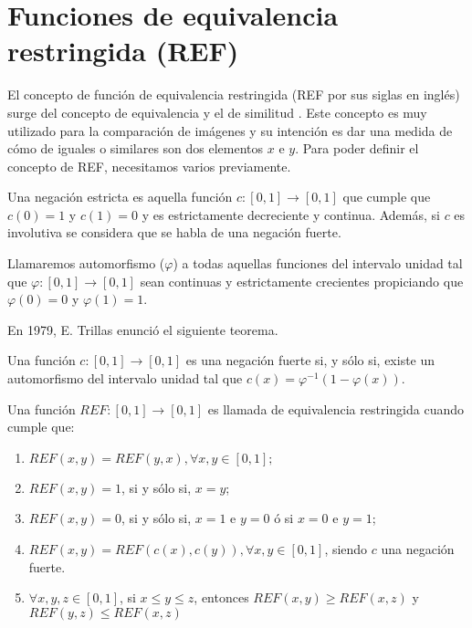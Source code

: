 \documentclass[main]{subfiles}
\begin{document}
\section{Funciones de equivalencia restringida (REF)}\label{sec:ref}
El concepto de función de equivalencia restringida (REF por sus siglas en inglés) surge del concepto de equivalencia y el de similitud \cite{art:refbarrenechea}. Este concepto es muy utilizado para la comparación de imágenes y su intención es dar una medida de cómo de iguales o similares son dos elementos $x$ e $y$. Para poder definir el concepto de REF, necesitamos varios previamente.

\begin{definition}\label{def:negacionestricta}
Una negación estricta es aquella función ${c : [0, 1] \rightarrow [0, 1]}$ que cumple que ${c(0)=1}$ y ${c(1)=0}$ y es estrictamente decreciente y continua. Además, si $c$ es involutiva se considera que se habla de una negación fuerte.
\end{definition}

\begin{definition}\label{def:automorfismo}
Llamaremos automorfismo ($\varphi$) a todas aquellas funciones del intervalo unidad tal que ${\varphi : [0, 1] \rightarrow [0, 1]}$ sean continuas y estrictamente crecientes propiciando que ${\varphi(0)=0}$ y ${\varphi(1)=1}$.
\end{definition}

En 1979, E. Trillas \cite{art:thtrillas} enunció el siguiente teorema.
\begin{theorem}\label{th:trillas}
Una función ${c : [0, 1] \rightarrow [0, 1]}$ es una negación fuerte si, y sólo si, existe un automorfismo del intervalo unidad tal que ${c(x)=\varphi^{-1}(1-\varphi(x))}$.
\end{theorem}

\begin{definition}\label{def:ref}
Una función ${REF  : [0, 1] \rightarrow [0, 1]}$ es llamada de equivalencia restringida cuando cumple que:
	\begin{enumerate}
	\item $REF(x, y) = REF(y, x), \forall x, y \in [0, 1];$
	\item $REF(x, y) = 1$, si y sólo si, $x=y$;
	\item $REF(x, y) = 0$, si y sólo si, $x=1$ e $y=0$ ó si $x=0$ e $y=1$;
	\item $REF(x, y) = REF(c(x), c(y)),  \forall x, y \in [0, 1]$, siendo $c$ una negación fuerte.
	\item $\forall x, y, z \in [0, 1]$, si $x\leq y\leq z$, entonces $REF(x, y)\geq REF(x, z)$ y  $REF(y, z)\leq REF(x, z)$
	\end{enumerate}
\end{definition}
\end{document}
